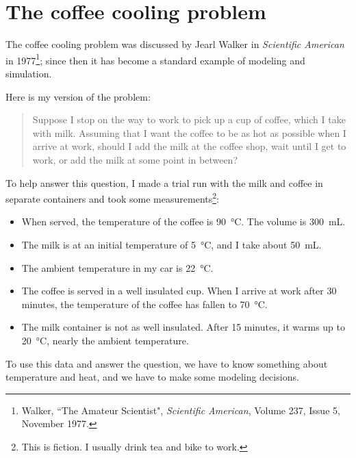 \documentclass[12pt]{book}
\theoremstyle{exercise}
\begin{document}

\section{The coffee cooling problem}

The coffee cooling problem was discussed by Jearl Walker in {\it Scientific American} in 1977\footnote{Walker, ``The Amateur Scientist", {\it Scientific American}, Volume 237, Issue 5, November 1977.}; since then it has become a standard example of modeling and simulation.


Here is my version of the problem:

\begin{quote}
Suppose I stop on the way to work to pick up a cup of coffee, which I take with milk.  Assuming that I want the coffee to be as hot as possible when I arrive at work, should I add the milk at the coffee shop, wait until I get to work, or add the milk at some point in between?
\end{quote}

To help answer this question, I made a trial run with the milk and coffee in separate containers and took some measurements\footnote{This is fiction.  I usually drink tea and bike to work.}:

\begin{itemize}

\item When served, the temperature of the coffee is \SI{90}{\celsius}.  The volume is \SI{300}{mL}.

\item The milk is at an initial temperature of \SI{5}{\celsius}, and I take about \SI{50}{mL}.

\item The ambient temperature in my car is \SI{22}{\celsius}.

\item The coffee is served in a well insulated cup.  When I arrive at work after 30 minutes, the temperature of the coffee has fallen to \SI{70}{\celsius}.

\item The milk container is not as well insulated.  After 15 minutes, it warms up to \SI{20}{\celsius}, nearly the ambient temperature.

\end{itemize}

To use this data and answer the question, we have to know something about temperature and heat, and we have to make some modeling decisions.
\end{document}
